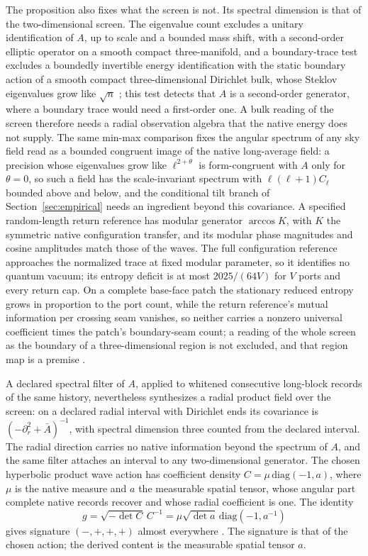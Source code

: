 \documentclass[11pt]{article}
\theoremstyle{definition}
\theoremstyle{remark}
\begin{document}
The proposition also fixes what the screen is not. Its spectral dimension is
that of the two-dimensional screen. The eigenvalue count excludes a unitary
identification of $A$, up to scale and a bounded mass shift, with a
second-order elliptic operator on a smooth compact three-manifold, and a
boundary-trace test excludes a boundedly invertible energy identification
with the static boundary action of a smooth compact three-dimensional
Dirichlet bulk, whose Steklov eigenvalues grow like $\sqrt n$
\cite{girouard2014}; this test detects that $A$ is a second-order
generator, where a boundary trace would need a first-order one. A bulk reading of the screen therefore needs a radial
observation algebra that the native energy does not supply. The same
min-max comparison fixes the angular spectrum of any sky field read as a
bounded congruent image of the native long-average field: a precision whose
eigenvalues grow like $\ell^{2+\theta}$ is form-congruent with $A$ only for
$\theta=0$, so such a field has the scale-invariant spectrum with
$\ell(\ell+1)C_\ell$ bounded above and below, and the conditional tilt
branch of Section~\ref{sec:empirical} needs an ingredient beyond this
covariance. A specified
random-length return reference has modular generator $\arccos K$, with $K$
the symmetric native configuration transfer, and its modular phase
magnitudes and cosine amplitudes match those of the waves. The full configuration reference approaches the normalized
trace at fixed modular parameter, so it identifies no quantum vacuum; its
entropy deficit is at most $2025/(64V)$ for $V$ ports and every return cap.
On a complete base-face patch the stationary reduced entropy grows in
proportion to the port count, while the return reference's mutual
information per crossing seam vanishes, so neither carries
a nonzero universal coefficient times the patch's boundary-seam count; a
reading of the whole screen as the boundary of a three-dimensional region
is not excluded, and that region map is a premise \cite{ophentropy}.

A declared spectral filter of $A$, applied to whitened consecutive long-block
records of the same history, nevertheless synthesizes a radial product field
over the screen: on a declared radial interval with Dirichlet ends its
covariance is $(-\partial_r^2+\bar A)^{-1}$, with spectral dimension three
counted from the declared interval. The radial direction carries no native
information beyond the spectrum of $A$, and the same filter attaches an
interval to any two-dimensional generator.
The chosen hyperbolic product wave action has coefficient density $C=\mu\,\mathrm{diag}(-1,a)$,
where $\mu$ is the native measure and $a$ the measurable spatial tensor, whose
angular part complete native records recover and whose radial coefficient is
one. The identity
\[
 g=\sqrt{-\det C}\,C^{-1}=\mu\sqrt{\det a}\,\mathrm{diag}(-1,a^{-1})
\]
gives signature $(-,+,+,+)$ almost everywhere \cite{ophspine}. The signature is
that of the chosen action; the derived content is the measurable spatial
tensor $a$.
\end{document}
